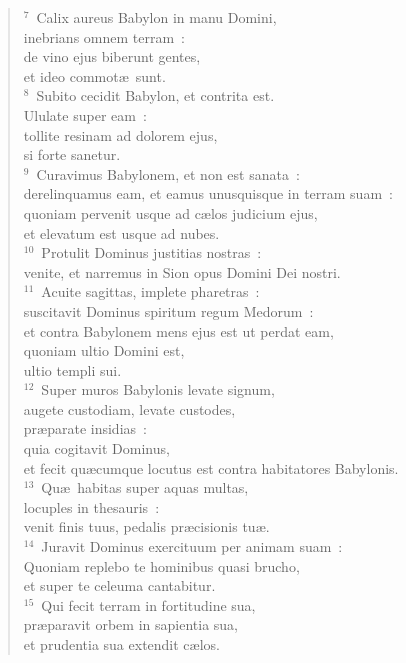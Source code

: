 \begin{verse}
${}^{7}$~Calix aureus Babylon in manu Domini,\\ inebrians omnem terram~:\\ de vino ejus biberunt gentes,\\ et ideo commot\ae\ sunt.\\
${}^{8}$~Subito cecidit Babylon, et contrita est.\\ Ululate super eam~:\\ tollite resinam ad dolorem ejus,\\ si forte sanetur.\\
${}^{9}$~Curavimus Babylonem, et non est sanata~:\\ derelinquamus eam, et eamus unusquisque in terram suam~:\\ quoniam pervenit usque ad c\ae los judicium ejus,\\ et elevatum est usque ad nubes.\\
${}^{10}$~Protulit Dominus justitias nostras~:\\ venite, et narremus in Sion opus Domini Dei nostri.\\
${}^{11}$~Acuite sagittas, implete pharetras~:\\ suscitavit Dominus spiritum regum Medorum~:\\ et contra Babylonem mens ejus est ut perdat eam,\\ quoniam ultio Domini est,\\ ultio templi sui.\\
${}^{12}$~Super muros Babylonis levate signum,\\ augete custodiam, levate custodes,\\ pr\ae parate insidias~:\\ quia cogitavit Dominus,\\ et fecit qu\ae cumque locutus est contra habitatores Babylonis.\\
${}^{13}$~Qu\ae\ habitas super aquas multas,\\ locuples in thesauris~:\\ venit finis tuus, pedalis pr\ae cisionis tu\ae .\\
${}^{14}$~Juravit Dominus exercituum per animam suam~:\\ Quoniam replebo te hominibus quasi brucho,\\ et super te celeuma cantabitur.\\
${}^{15}$~Qui fecit terram in fortitudine sua,\\ pr\ae paravit orbem in sapientia sua,\\ et prudentia sua extendit c\ae los.\\

\end{verse}
